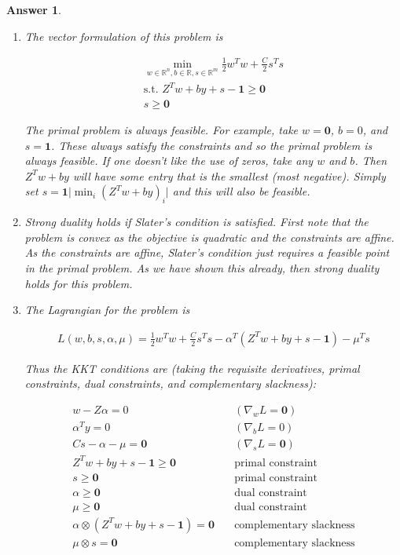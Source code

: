 \documentclass[12pt]{article}
\theoremstyle{colon}
\newtheorem*{answer}{Answer}
\begin{document}
\begin{answer}
  \

  \begin{enumerate}[label=\alph*)]
    \item The vector formulation of this problem is

      \begin{gather*}
        \min_{w \in \mathbb{R}^n, b \in \mathbb{R}, s \in \mathbb{R}^m} \frac{1}{2} w^T w + \frac{C}{2} s^T s \\
        \text{s.t. } Z^T w + b y + s - \bm{1} \geq \bm{0} \\
        s \geq \bm{0}
      \end{gather*}

      The primal problem is always feasible. For example, take $w = \bm{0}$, $b = 0$, and $s = \bm{1}$. These always satisfy the constraints and so the primal problem is always feasible. If one doesn't like the use of zeros, take any $w$ and $b$. Then $Z^T w + by$ will have some entry that is the smallest (most negative). Simply set $s = \bm{1} \lvert \min_i (Z^T w + by)_i \rvert$ and this will also be feasible.

    \item Strong duality holds if Slater's condition is satisfied. First note that the problem is convex as the objective is quadratic and the constraints are affine. As the constraints are affine, Slater's condition just requires a feasible point in the primal problem. As we have shown this already, then strong duality holds for this problem.

    \item The Lagrangian for the problem is

      \begin{gather*}
        L(w, b, s, \alpha, \mu) = \frac{1}{2} w^T w + \frac{C}{2} s^T s - \alpha^T (Z^T w + b y + s - \bm{1}) - \mu^T s
      \end{gather*}

      Thus the KKT conditions are (taking the requisite derivatives, primal constraints, dual constraints, and complementary slackness):

      \begin{align*}
        w - Z \alpha = 0& \quad (\nabla_w L = \bm{0}) \\
        \alpha^T y = 0& \quad (\nabla_b L = 0) \\
        C s - \alpha - \mu = \bm{0}& \quad (\nabla_s L = \bm{0})\\
        Z^T w + b y + s - \bm{1} \geq \bm{0}& \quad \text{primal constraint} \\
        s \geq \bm{0}& \quad \text{primal constraint} \\
        \alpha \geq \bm{0}& \quad \text{dual constraint} \\
        \mu \geq \bm{0}& \quad \text{dual constraint} \\
        \alpha \otimes (Z^T w + b y + s - \bm{1})= \bm{0}& \quad \text{complementary slackness} \\
        \mu \otimes s= \bm{0}& \quad \text{complementary slackness}
      \end{align*}


\end{enumerate}
\end{answer}
\end{document}
